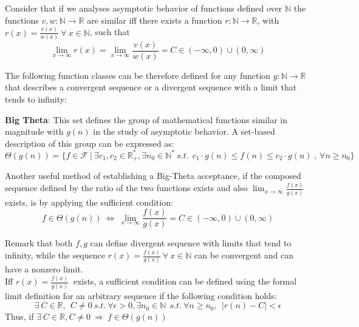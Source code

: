 \begin{lemma}
  Consider that if we analyses asymptotic behavior of functions defined over $\mathbb{N}$ the functions $v,w:\mathbb{N}\longrightarrow\mathbb{R}$ are similar iff there exists a function $r:\mathbb{N}\longrightarrow\mathbb{R}$, with $r(x) = \frac{v(x)}{w(x)}\ \forall\ x\in\mathbb{N}$, such that
  \[\lim_{x\to\infty} r(x) = \lim_{x\to\infty} \frac{v(x)}{w(x)} = C \in (-\infty, 0) \cup (0,\infty) \]
\end{lemma}

The following function classes can be therefore defined for any function $g:\mathbb{N}\longrightarrow\mathbb{R}$ that describes a convergent sequence or a divergent sequence with a limit that tends to infinity:
\begin{definition}   
  \textbf{Big Theta}: This set defines the group of mathematical functions similar in magnitude with  $g(n)$ in the study of asymptotic behavior. A set-based description of this group can be expressed as:
  \[\Theta(g(n))= \lbrace f \in \mathcal{F}\ |\ \exists c_{1}, c_{2} \in \mathbb{R}^{*}_{+}, \exists n_{0} \in \mathbb{N}^{*}\ s.t.\ \ c_{1} \cdot g(n) \leq f(n) \leq c_{2} \cdot g(n)\ ,\  \forall n \geq n_{0} \rbrace\]
\end{definition}  

\begin{lemma}
  Another useful method of establishing a Big-Theta acceptance, if the composed sequence defined by the ratio of the two functions exists and also $ \lim_{x\to\infty} \frac{f(x)}{g(x)}$ exists, is by applying the sufficient condition:
    \[ f \in \Theta(g(n))\ \Leftrightarrow\ \lim_{x\to\infty} \frac{f(x)}{g(x)} = C \in (-\infty, 0) \cup (0,\infty) \]
\end{lemma}

Remark that  both $f,g$ can define divergent sequence with limits that tend to infinity, while the sequence $r(x) = \frac{f(x)}{g(x)}\ \forall\ x\in\mathbb{N}$ can be convergent and can have a nonzero limit. \\
Iff $ r(x) = \frac{f(x)}{g(x)}\ $ exists, a sufficient condition can be defined using the formal limit definition for an arbitrary sequence if the following condition holds:
  \[\exists \  C \in \mathbb{R}, \ \ C \neq 0 \ s.t. \ \forall \epsilon > 0,\exists n_{0} \in \mathbb{N}\ \ s.t.\ \forall n\geq n_{0}, \ \  |r(n) - C| < \epsilon  \]
  Thus, if $ \exists \  C \in \mathbb{R}, C \neq 0 \  \Rightarrow\  f \in \Theta(g(n))\ $


